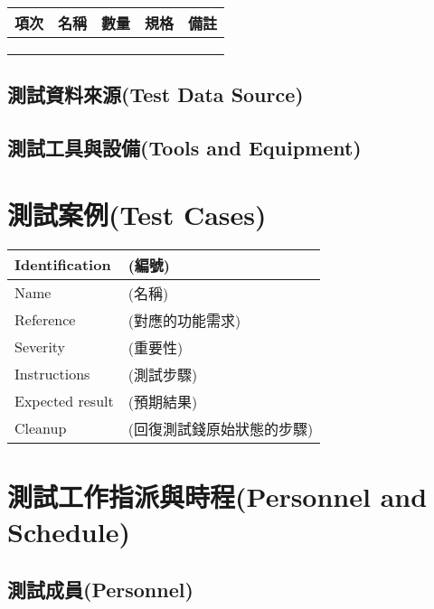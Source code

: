 \documentclass{article}
\begin{document}
\begin{tabularx}{\textwidth}{| c | C | c | C | M{0.15\textwidth} |}
	\hline
	項次 & 名稱 & 數量 & 規格 & 備註 \\ \hline
	   &    &    &    &    \\ \hline
	   &    &    &    &    \\ \hline
	   &    &    &    &    \\ \hline
\end{tabularx}

\subsection[測試資料來源(TEST DATA SOURCE)]{測試資料來源(Test Data Source)}

\subsection[測試工具與設備(TOOLS AND EQUIPMENT)]{測試工具與設備(Tools and Equipment)}

\newpage

\section[測試案例(TEST CASES)]{測試案例(Test Cases)}

\begin{tabularx}{\textwidth}{| A{0.3\textwidth} | X |}
	\hline
	Identification  & (編號)           \\ \hline
	Name            & (名稱)           \\ \hline
	Reference       & (對應的功能需求)      \\ \hline
	Severity        & (重要性)          \\ \hline
	Instructions    & (測試步驟)         \\ \hline
	Expected result & (預期結果)         \\ \hline
	Cleanup         & (回復測試錢原始狀態的步驟) \\ \hline
\end{tabularx}

\newpage

\section[測試工作指派與時程(PERSONNEL AND SCHEDULE)]{測試工作指派與時程(Personnel and Schedule)}

\subsection[測試成員(PERSONNEL)]{測試成員(Personnel)}
\end{document}
